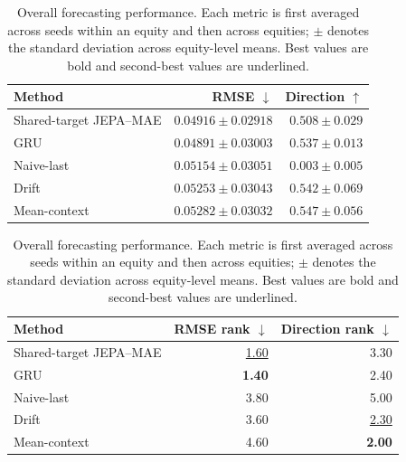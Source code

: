 \begin{table}[t]
\centering
\small
\caption{Overall forecasting performance. Each metric is first averaged across seeds within an equity and then across equities; $\pm$ denotes the standard deviation across equity-level means. Best values are bold and second-best values are underlined.}
\label{tab:main_metrics}
\begin{tabular}{lrr}
\toprule
Method & RMSE $\downarrow$ & Direction $\uparrow$ \\
\midrule
Shared-target JEPA--MAE & \underline{$0.04916 \pm 0.02918$} & $0.508 \pm 0.029$ \\
GRU & \textbf{$0.04891 \pm 0.03003$} & $0.537 \pm 0.013$ \\
Naive-last & $0.05154 \pm 0.03051$ & $0.003 \pm 0.005$ \\
Drift & $0.05253 \pm 0.03043$ & \underline{$0.542 \pm 0.069$} \\
Mean-context & $0.05282 \pm 0.03032$ & \textbf{$0.547 \pm 0.056$} \\
\bottomrule
\end{tabular}
\par\medskip
\begin{tabular}{lrr}
\toprule
Method & RMSE rank $\downarrow$ & Direction rank $\downarrow$ \\
\midrule
Shared-target JEPA--MAE & \underline{1.60} & 3.30 \\
GRU & \textbf{1.40} & 2.40 \\
Naive-last & 3.80 & 5.00 \\
Drift & 3.60 & \underline{2.30} \\
Mean-context & 4.60 & \textbf{2.00} \\
\bottomrule
\end{tabular}
\end{table}
